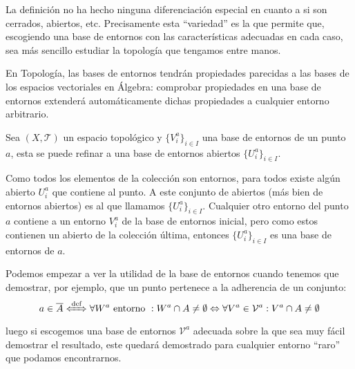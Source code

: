 \begin{obs}
La definición no ha hecho ninguna diferenciación especial en cuanto a si son cerrados, abiertos, etc. Precisamente esta ``variedad'' es la que permite que, escogiendo una base de entornos con las características adecuadas en cada caso, sea más sencillo estudiar la topología que tengamos entre manos.

En Topología, las bases de entornos tendrán propiedades parecidas a las bases de los espacios vectoriales en Álgebra: comprobar propiedades en una base de entornos extenderá automáticamente dichas propiedades a cualquier entorno arbitrario.
\end{obs}

\begin{prop}
Sea $(X,\mathcal{T})$ un espacio topológico y $\{V_i^a \}_{i\in I}$ una base de entornos de un punto $a$, esta se puede refinar a una base de entornos abiertos $\{U_i^a\}_{i\in I}$. 
\end{prop}
\begin{demo}    
Como todos los elementos de la colección son entornos, para todos existe algún abierto $U_i^a$ que contiene al punto. A este conjunto de abiertos (más bien de entornos abiertos) es al que llamamos $\{U_i^a\}_{i\in I}$. Cualquier otro entorno del punto $a$ contiene a un entorno $V_i^a$ de la base de entornos inicial, pero como estos contienen un abierto de la colección última, entonces $\{U_i^a\}_{i\in I}$ es una base de entornos de  $a$.
\end{demo}

\begin{obs}    
Podemos empezar a ver la utilidad de la base de entornos cuando tenemos que demostrar, por ejemplo, que un punto pertenece a la adherencia de un conjunto:
$$
a \in \overline{A} \xLeftrightarrow{\text{def}} \forall W^a \text{ entorno }: W^a \cap A \neq \emptyset \Leftrightarrow \forall V^a \in \mathcal{V}^a: V^a\cap A \neq \emptyset
$$
luego si escogemos una base de entornos $\mathcal{V}^a$ adecuada sobre la que sea muy fácil demostrar el resultado, este quedará demostrado para cualquier entorno ``raro'' que podamos encontrarnos.
\end{obs}

